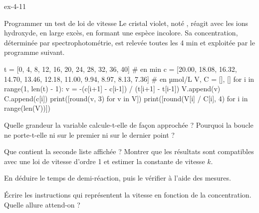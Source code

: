 \begin{blocLivre}{ex-4-11}
\begin{exercice}[2]{Programmer un test de loi de vitesse}
Le cristal violet, noté , réagit avec les ions hydroxyde, en large excès, en formant une espèce incolore.
Sa concentration, déterminée par spectrophotométrie, est relevée toutes les 4 min et exploitée par le programme suivant.
\begin{python}
t = [0, 4, 8, 12, 16, 20, 24, 28, 32, 36, 40]     # en min
c = [20.00, 18.08, 16.32, 14.70, 13.46, 12.18,
     11.00, 9.94, 8.97, 8.13, 7.36]               # en µmol/L
V, C = [], []
for i in range(1, len(t) - 1):
    v = -(c[i+1] - c[i-1]) / (t[i+1] - t[i-1])
    V.append(v)
    C.append(c[i])
print([round(v, 3) for v in V])
print([round(V[i] / C[i], 4) for i in range(len(V))])
\end{python}
\begin{console}
[0.46, 0.422, 0.357, 0.315, 0.308, 0.28, 0.254, 0.226, 0.201]
[0.0254, 0.0259, 0.0243, 0.0234, 0.0252, 0.0255, 0.0255, 0.0252, 0.0248]
\end{console}
\begin{questions}
\item {}Quelle grandeur la variable  calcule-t-elle de façon approchée ? Pourquoi
la boucle ne porte-t-elle ni sur le premier ni sur le dernier point ?
\item Que contient la seconde liste affichée ? Montrer que les résultats sont compatibles avec une loi de vitesse
d'ordre 1 et estimer la constante de vitesse $k$.
\item En déduire le temps de demi-réaction, puis le vérifier à l'aide des mesures.
\item Écrire les instructions qui représentent la vitesse en fonction de la concentration. Quelle allure attend-on ?
\end{questions}
\end{exercice}
\end{blocLivre}
